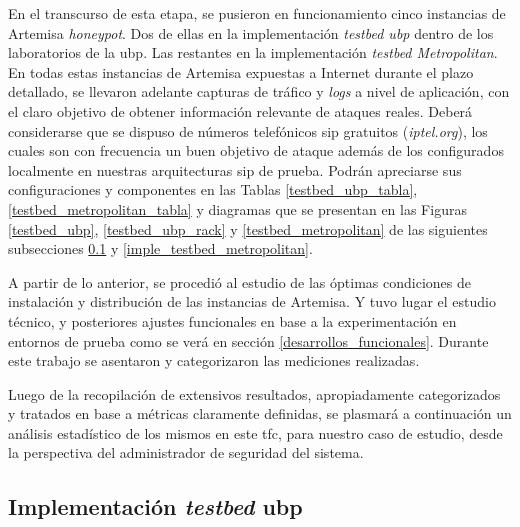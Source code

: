 \documentclass[a4paper,12pt]{report}
\begin{document}
En el transcurso de esta etapa, se pusieron en funcionamiento cinco
instancias de Artemisa \emph{honeypot}. Dos de ellas en la implementación
\emph{testbed \ac{ubp}} dentro de los laboratorios de la \ac{ubp}. Las
restantes en la implementación \emph{testbed Metropolitan}. En todas
estas instancias de Artemisa expuestas a Internet
durante el plazo detallado, se llevaron adelante capturas de tráfico y \emph{logs} a
nivel de aplicación, con el claro objetivo de obtener información relevante de
ataques reales. Deberá considerarse que se dispuso de números telefónicos \ac{sip}
gratuitos (\emph{iptel.org}), los cuales son con frecuencia un buen objetivo de
ataque además de los configurados localmente en nuestras arquitecturas \ac{sip} de
prueba. Podrán apreciarse sus configuraciones y componentes en las Tablas \ref{testbed_ubp_tabla},
\ref{testbed_metropolitan_tabla} y diagramas que se presentan en las Figuras \ref{testbed_ubp},
\ref{testbed_ubp_rack} y \ref{testbed_metropolitan} 
de las siguientes subsecciones \ref{imple_tetsbed_ubp} y \ref{imple_testbed_metropolitan}.

A partir de lo anterior, se procedió al estudio de las óptimas
condiciones de instalación y distribución de las instancias de Artemisa. Y tuvo
lugar el estudio técnico, y posteriores ajustes funcionales en base a la
experimentación en entornos de prueba como se verá en
sección \ref{desarrollos_funcionales}. Durante este trabajo se asentaron y categorizaron las
mediciones realizadas. 

Luego de la recopilación de extensivos resultados, apropiadamente
categorizados y tratados en base a métricas claramente definidas,
se plasmará a continuación  un análisis estadístico de los mismos en
este \ac{tfc}, para nuestro caso de estudio, desde la
perspectiva del administrador de seguridad del sistema.



\subsection{Implementación \emph{testbed} \ac{ubp}}
\label{imple_tetsbed_ubp}
\end{document}

